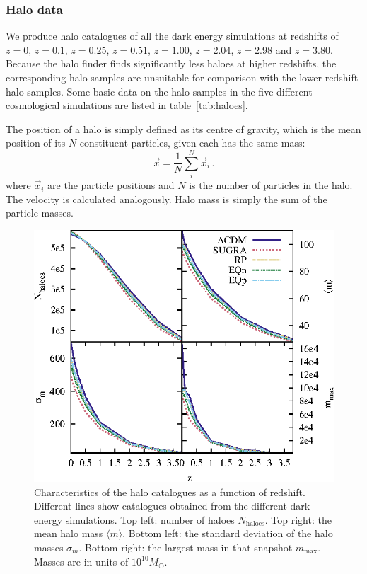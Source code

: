 \subsubsection{Halo data}
We produce halo catalogues of all the dark energy simulations at redshifts of $z=0$, $z = 0.1$, $z=0.25$, $z=0.51$, $z=1.00$, $z=2.04$, 
$z=2.98$ and $z=3.80$. Because the halo finder finds significantly less haloes at higher redshifts, the corresponding halo samples 
are unsuitable for comparison with the lower redshift halo samples. Some basic data on the halo samples in the five different 
cosmological simulations are listed in table~\ref{tab:haloes}. 

The position of a halo is simply defined as its centre of gravity, which is the mean position of its $N$ constituent 
particles, given each has the same mass:
\begin{equation}
{\vec x} = \frac{1}{N} \sum_i^{N} {\vec x}_i \,.
\end{equation}
where ${\vec x}_i$ are the particle positions and $N$ is the number of particles in the halo. The velocity is calculated 
analogously. Halo mass is simply the sum of the particle masses.

\begin{figure}
\includegraphics[width=\textwidth]{ch_voidsde/img/halo_data}
\caption{Characteristics of the halo catalogues as a function of redshift. Different lines show catalogues obtained from the different dark energy simulations. Top left: number of haloes $N_\mathrm{haloes}$. Top right: the mean halo mass $\langle m \rangle$. Bottom left: the standard deviation of the halo masses $\sigma_m$. Bottom right: the largest mass in that snapshot $m_\mathrm{max}$. Masses are in units of $10^{10} M_\odot$.}
\label{fig:halo_data}
\end{figure}

